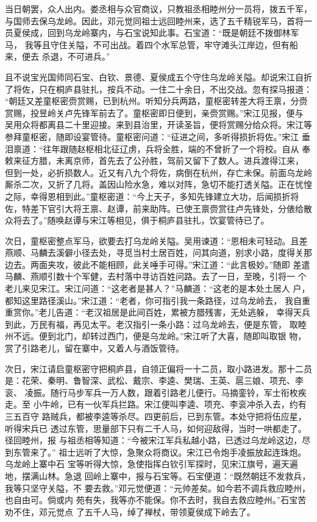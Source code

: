 当日朝罢，众人出内。娄丞相与众官商议，只教祖丞相睦州分一员将，拨五千军，
与国师去保乌龙岭。因此，邓元觉同祖士远回睦州来，选了五千精锐军马，首将一
员夏侯成，回到乌龙岭寨内，与石宝说知此事。石宝道：“既是朝廷不拨御林军马，
我等且守住关隘，不可出战。着四个水军总管，牢守滩头江岸边，但有船来，便去
杀退，不可进兵。”

且不说宝光国师同石宝、白钦、景德、夏侯成五个守住乌龙岭关隘。却说宋江自折
了将佐，只在桐庐县驻扎，按兵不动。一住二十余日，不出交战。忽有探马报道：
“朝廷又差童枢密赍赏赐，已到杭州。听知分兵两路，童枢密转差大将王禀，分赍
赏赐，投昱岭关卢先锋军前去了。童枢密即日便到，亲赍赏赐。”宋江见报，便与
吴用众将都离县二十里迎接。来到县治里，开读圣旨，便将赏赐分给众将。宋江等
参拜童枢密，随即设宴管待。童枢密问道：“征进之间，多听得损折将佐。”宋江
垂泪禀道：“往年跟随赵枢相北征辽虏，兵将全胜，端的不曾折了一个将校。自从
奉敕来征方腊，未离京师，首先去了公孙胜，驾前又留下了数人。进兵渡得江来，
但到一处，必折损数人。近又有八九个将佐，病倒在杭州，存亡未保。前面乌龙岭
厮杀二次，又折了几将。盖因山险水急，难以对阵，急切不能打透关隘。正在忧惶
之际，幸得恩相到此。”童枢密道：“今上天子，多知先锋建立大功，后闻损折将
佐，特差下官引大将王禀、赵谭，前来助阵。已使王禀赍赏往卢先锋处，分俵给散
众将去了。”随唤赵谭与宋江等相见，俱于桐庐县驻扎，饮宴管待已了。

次日，童枢密整点军马，欲要去打乌龙岭关隘。吴用谏道：“恩相未可轻动。且差
燕顺、马麟去溪僻小径去处，寻觅当村土居百姓，问其向道，别求小路，度得关那
边去。两面夹攻，彼此不能相顾，此关唾手可得。”宋江道：“此言极妙。”随即
差遣马麟、燕顺引数十个军健，去村落中寻访百姓问路。去了一日，至晚，引将一
个老儿来见宋江。宋江问道：“这老者是甚人？”马麟道：“这老的是本处土居人
户，都知这里路径溪山。”宋江道：“老者，你可指引我一条路径，过乌龙岭去，
我自重重赏你。”老儿告道：“老汉祖居是此间百姓，累被方腊残害，无处逃躲，
幸得天兵到此，万民有福，再见太平。老汉指引一条小路：过乌龙岭去，便是东管，
取睦州不远。便到北门，却转过西门，便是乌龙岭。”宋江听了大喜，随即叫取银
物，赏了引路老儿，留在寨中，又着人与酒饭管待。

次日，宋江请启童枢密守把桐庐县，自领正偏将一十二员，取小路进发。那十二员
是：花荣、秦明、鲁智深、武松、戴宗、李逵、樊瑞、王英、扈三娘、项充、李衮、
凌振。随行马步军兵一万人数，跟着引路老儿便行。马摘銮铃，军士衔枚疾走。至
小牛岭，已有一伙军兵拦路。宋江便叫李逵、项充、李衮冲杀入去，约有三五百守
路贼兵，都被李逵等杀尽。四更前后，已到东管。本处守把将伍应星，听得宋兵已
透过东管，思量部下只有二千人马，如何迎敌得，当时一哄都走了。径回睦州，报
与祖丞相等知道：“今被宋江军兵私越小路，已透过乌龙岭这边，尽到东管来了。”
祖士远听了大惊，急聚众将商议。宋江已令炮手凌振放起连珠炮。乌龙岭上寨中石
宝等听得大惊，急使指挥白钦引军探时，见宋江旗号，遍天遍地，摆满山林。急退
回岭上寨中，报与石宝等。石宝便道：“既然朝廷不发救兵，我等只坚守关隘，不
要去救。”邓元觉便道：“元帅差矣。如今若不调兵救应睦州，也自由可。倘或内
苑有失，我等亦不能保。你不去时，我自去救应睦州。”石宝苦劝不住，邓元觉点
了五千人马，绰了禅杖，带领夏侯成下岭去了。


